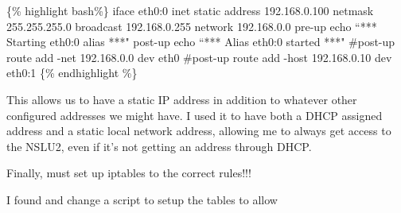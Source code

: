 \{\% highlight bash\%\} iface eth0:0 inet static address 192.168.0.100
netmask 255.255.255.0 broadcast 192.168.0.255 network 192.168.0.0 pre-up
echo ``*** Starting eth0:0 alias ***" post-up echo ``*** Alias eth0:0
started ***" \#post-up route add -net 192.168.0.0 dev eth0 \#post-up
route add -host 192.168.0.10 dev eth0:1 \{\% endhighlight \%\}

This allows us to have a static IP address in addition to whatever other
configured addresses we might have. I used it to have both a DHCP
assigned address and a static local network address, allowing me to
always get access to the NSLU2, even if it's not getting an address
through DHCP.

Finally, must set up iptables to the correct rules!!!

I found and change a script to setup the tables to allow
